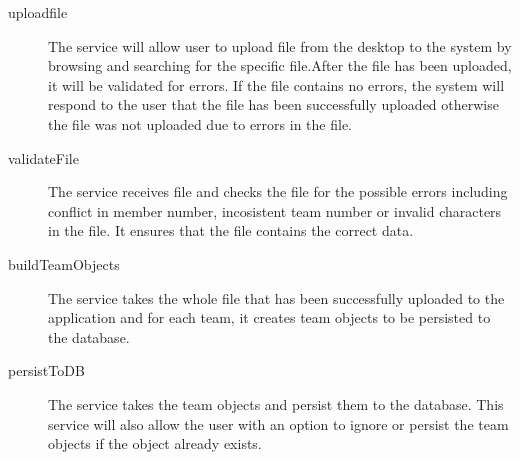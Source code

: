 

\begin{description}
\item[uploadfile] The service will allow user to upload file from the desktop to the system  by browsing and searching for the specific file.After the file has been uploaded, it will be validated for errors. If the file contains no errors, the system will respond to the user that the file has been successfully uploaded otherwise the file was not uploaded due to errors in the file.


\item[validateFile] The service receives file and checks the file for the possible errors including conflict in member number, incosistent team number or invalid characters in the file. It ensures that the file contains the correct data.

\item[buildTeamObjects] The service takes the whole file that has been successfully uploaded to the application and for each team, it creates team objects to be persisted to the database. 

\item[persistToDB] The service takes the team objects and persist them to the database. This service will also allow the user with an option to ignore or persist the team objects if the object already exists. 

\end{description}  







